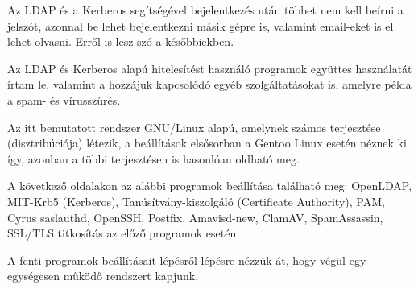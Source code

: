 Az LDAP és a Kerberos segítségével bejelentkezés után többet nem kell beírni a jelszót, azonnal be lehet bejelentkezni
másik gépre is, valamint email-eket is el lehet olvasni. Erről is lesz szó a későbbiekben.

Az LDAP és Kerberos alapú hitelesítést használó programok együttes használatát írtam le, valamint a hozzájuk
kapcsolódó egyéb szolgáltatásokat is, amelyre példa a spam- és vírusszűrés.

Az itt bemutatott rendszer GNU/Linux alapú, amelynek számos terjesztése (disztribúciója) létezik, a beállítások
elsősorban a Gentoo Linux esetén néznek ki így, azonban a többi terjesztésen is hasonlóan oldható meg.

A következő oldalakon az alábbi programok beállítása található meg:
OpenLDAP,
MIT-Krb5 (Kerberos),
Tanúsítvány-kiszolgáló (Certificate Authority),
PAM,
Cyrus saslauthd,
OpenSSH,
Postfix,
Amavisd-new,
ClamAV,
SpamAssassin,
SSL/TLS titkosítás az előző programok esetén
  
A fenti programok beállításait lépésről lépésre nézzük át, hogy végül egy egységesen működő rendszert kapjunk.
  
